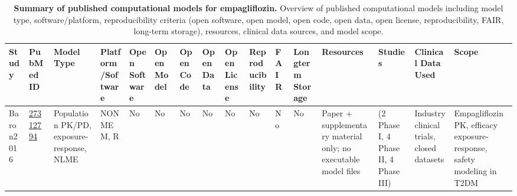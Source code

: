 \begin{landscape}
\begin{table}[H]
\centering
\tabcolsep=3pt
\renewcommand{\arraystretch}{1.3}
\tiny
\begin{threeparttable} 

\caption{\scriptsize{\textbf{Summary of published computational models for empagliflozin.} 
Overview of published computational models including model type, software/platform, 
reproducibility criteria (open software, open model, open code, open data, open license,
reproducibility, FAIR, long-term storage), resources, clinical data sources, and model scope.}}

\begin{tabularx}{\linewidth}{
    >{\centering\arraybackslash}m{1.5cm}  %
    >{\centering\arraybackslash}m{0.8cm}  %
    >{\centering\arraybackslash}m{1.5cm}  %
    >{\centering\arraybackslash}m{1.3cm}  %
    >{\centering\arraybackslash}m{0.7cm}  %
    >{\centering\arraybackslash}m{0.7cm}  %
    >{\centering\arraybackslash}m{0.7cm}  %
    >{\centering\arraybackslash}m{0.7cm}  %
    >{\centering\arraybackslash}m{0.7cm}  %
    >{\centering\arraybackslash}m{0.7cm}  %
    >{\centering\arraybackslash}m{0.7cm}  %
    >{\centering\arraybackslash}m{0.7cm}  %
    >{\centering\arraybackslash}m{2.3cm}  %
    >{\centering\arraybackslash}m{1.8cm}  %
    >{\centering\arraybackslash}m{2.3cm}  %
    >{\centering\arraybackslash}m{4.4cm}  %
}
\toprule
\textbf{Study} & \textbf{PubMed ID} & \textbf{Model Type} & \textbf{Platform/Software} & \textbf{Open Software} & \textbf{Open Model} & \textbf{Open Code} & \textbf{Open Data} & \textbf{Open License} & \textbf{Reprodu\-cibility} & \textbf{FAIR} & \textbf{Longterm Storage} & \textbf{Resources} & \textbf{Studies} & \textbf{Clinical Data Used} & \textbf{Scope} \\
\midrule
Baron2016 \cite{Baron2016} & \href{https://pubmed.ncbi.nlm.nih.gov/27312794/}{27312794} & Population PK/PD, exposure-response, NLME & NONMEM, R & \cellcolor{red!20}No & \cellcolor{red!20}No & \cellcolor{red!20}No & \cellcolor{red!20}No & \cellcolor{red!20}No & \cellcolor{red!20}No & \cellcolor{red!20}No & \cellcolor{red!20}No & Paper + supplementary material only; no executable model files & 10 (2 Phase I, 4 Phase II, 4 Phase III) & Industry clinical trials, closed datasets & Empagliflozin PK, efficacy exposure-response, safety modeling in T2DM \\

\end{tabularx}
\end{threeparttable}
\end{table}
\end{landscape}
